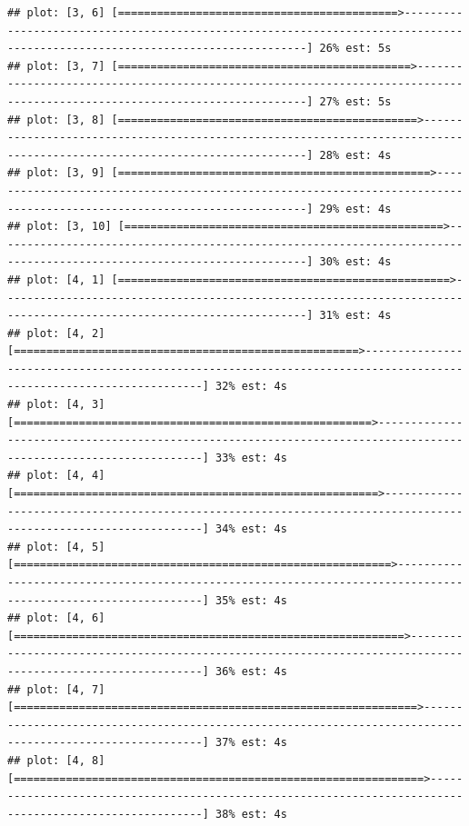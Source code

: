 \documentclass[
]{article}
\begin{document}
\begin{verbatim}
## plot: [3, 6] [===========================================>-----------------------------------------------------------------------------------------------------------------------------] 26% est: 5s 
## plot: [3, 7] [=============================================>---------------------------------------------------------------------------------------------------------------------------] 27% est: 5s 
## plot: [3, 8] [==============================================>--------------------------------------------------------------------------------------------------------------------------] 28% est: 4s 
## plot: [3, 9] [================================================>------------------------------------------------------------------------------------------------------------------------] 29% est: 4s 
## plot: [3, 10] [=================================================>----------------------------------------------------------------------------------------------------------------------] 30% est: 4s 
## plot: [4, 1] [===================================================>---------------------------------------------------------------------------------------------------------------------] 31% est: 4s 
## plot: [4, 2] [=====================================================>-------------------------------------------------------------------------------------------------------------------] 32% est: 4s 
## plot: [4, 3] [=======================================================>-----------------------------------------------------------------------------------------------------------------] 33% est: 4s 
## plot: [4, 4] [========================================================>----------------------------------------------------------------------------------------------------------------] 34% est: 4s 
## plot: [4, 5] [==========================================================>--------------------------------------------------------------------------------------------------------------] 35% est: 4s 
## plot: [4, 6] [============================================================>------------------------------------------------------------------------------------------------------------] 36% est: 4s 
## plot: [4, 7] [==============================================================>----------------------------------------------------------------------------------------------------------] 37% est: 4s 
## plot: [4, 8] [===============================================================>---------------------------------------------------------------------------------------------------------] 38% est: 4s 

\end{verbatim}
\end{document}
